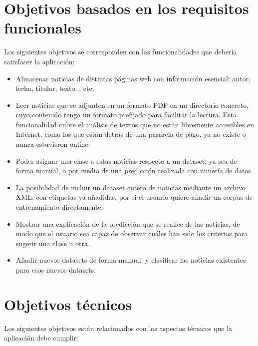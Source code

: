 
\section{Objetivos basados en los requisitos funcionales}

Los siguientes objetivos se corresponden con las funcionalidades que debería satisfacer la aplicación:

\begin{itemize}

\item Almacenar noticias de distintas páginas web con información esencial: autor, fecha, titular, texto... etc.

\item Leer noticias que se adjunten en un formato PDF en un directorio concreto, cuyo contenido tenga un formato prefijado para facilitar la lectura. Esta funcionalidad cubre el análisis de textos que no están libremente accesibles en Internet, como los que están detrás de una pasarela de pago, ya no existe o nunca estuvieron online.

\item Poder asignar una clase a estas noticias respecto a un dataset, ya sea de forma manual, o por medio de una predicción realizada con minería de datos.

\item La posibilidad de incluir un dataset entero de noticias mediante un archivo XML, con etiquetas ya añadidas, por si el usuario quiere añadir un corpus de entrenamiento directamente.

\item Mostrar una explicación de la predicción que se realice de las noticias, de modo que el usuario sea capaz de observar cuáles han sido los criterios para sugerir una clase u otra.

\item Añadir nuevos datasets de forma manual, y clasificar las noticias existentes para esos nuevos datasets.

\end{itemize}


\section{Objetivos técnicos}

Los siguientes objetivos están relacionados con los aspectos técnicos que la aplicación debe cumplir: 


